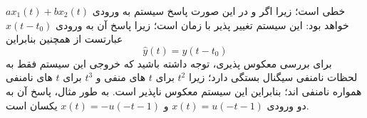 \documentclass[10pt,letterpaper]{article}
\begin{document}
خطی است؛ زیرا اگر
و
در این صورت پاسخ سیستم به ورودی 
$
ax_1(t)+bx_2(t)
$
 خواهد بود:
این سیستم تغییر پذیر با زمان است؛ زیرا پاسخ آن به ورودی 
$
x(t-t_0)
$
 عبارتست از
همچنین
بنابراین
$$
\hat y(t)=y(t-t_0)
$$
برای بررسی معکوس پذیری، توجه داشته باشید که خروجی این سیستم فقط به لحظات نامنفی سیگنال بستگی دارد؛ زیرا 
$
t^2
$
 برای 
$
t
$
 های منفی و 
$
t^3
$
 برای 
$
t
$ های نامنفی همواره نامنفی اند؛ بنابراین این سیستم معکوس ناپذیر است. به طور مثال، پاسخ آن به دو ورودی 
$
x(t)=u(-t-1)
$
 و
 $
x(t)=-u(-t-1)
$ یکسان است.
\end{document}
